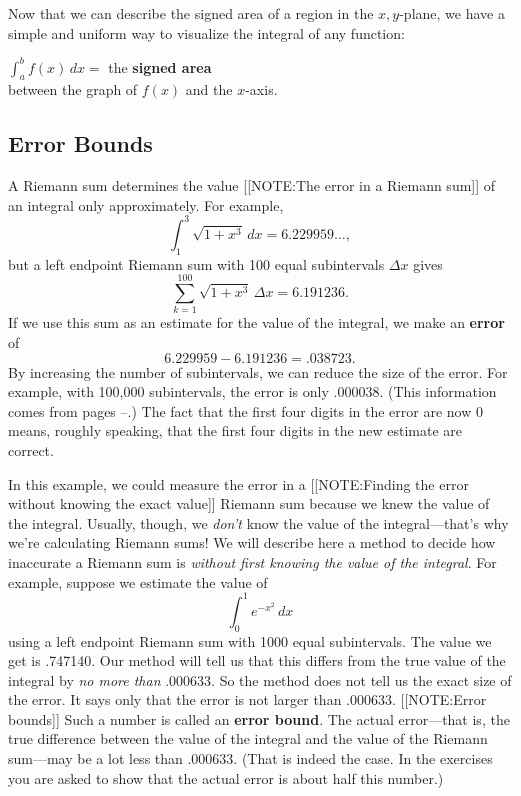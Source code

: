 Now that we can describe the signed area of a region in the $x,
y$-plane, we have a simple and uniform way to visualize the integral
of any function:
\begin{observation}
$\displaystyle \int_a^b f(x)\,dx =$ 
			the {\bf signed area} \\
between the graph of $f(x)$ and the $x$-axis.
\end{observation}


\subsection{Error Bounds}
\label{subsec:error-bounds}

	A Riemann sum determines the value 
	[[NOTE:The error in  a Riemann sum]]
of an integral only approximately.  For example,
	\[
\int_1^3 \sqrt{1 + x^3} \, dx = 6.229959\ldots ,
\] 
but\label{2ndint} a left endpoint Riemann sum with 100 equal
subintervals $\Delta x$ gives
	\[
\sum_{k = 1}^{100} \sqrt{1 + x^3} \, \Delta x = 
		6.191236.
\]
If we use this sum as an estimate for the value of the integral, we make an {\bf error} of
\[
6.229959 - 6.191236 = .038723.
\]
By increasing the number of subintervals, we can reduce the size of
the error.  For example, with 100,000 subintervals, the error is only
.000038.  (This information comes from
pages \pageref{ref1}--\pageref{ref2}.)  The fact that the first four
digits in the error are now 0 means, roughly speaking, that the first
four digits in the new estimate are correct.

In this example, we could measure the error in a 
[[NOTE:Finding the error without knowing  the exact value]]
Riemann sum because we knew the value of the integral.  Usually,
though, we {\em don't\/} know the value of the integral---that's why
we're calculating Riemann sums!  We will describe here a method to
decide how inaccurate a Riemann sum is {\em without first knowing the
  value of the integral}.  For example, suppose we estimate the value
of
	\[
\int_0^1 e^{-x^2} \, dx
\]
using a left endpoint Riemann sum with 1000 equal subintervals.  The value we get is .747140.  Our method will tell us that this differs from the true value of the integral by {\em no more than\/} .000633.  So the method does not tell us the exact size of the error.  It says only that the error is not larger than .000633.  
	[[NOTE:Error bounds]]
Such a number is called an {\bf error bound}.  The actual error---that is, the true difference between the value of the integral and the value of the Riemann sum---may be a lot less than .000633.  (That is indeed the case.  In the exercises you are asked to show that the actual error is about half this number.)  

